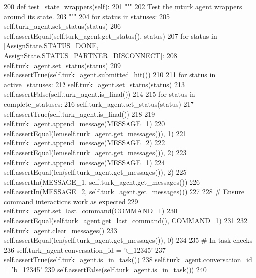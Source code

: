 \begin{DoxyCode}
200     \textcolor{keyword}{def }test\_state\_wrappers(self):
201         \textcolor{stringliteral}{"""}
202 \textcolor{stringliteral}{        Test the mturk agent wrappers around its state.}
203 \textcolor{stringliteral}{        """}
204         \textcolor{keywordflow}{for} status \textcolor{keywordflow}{in} statuses:
205             self.turk\_agent.set\_status(status)
206             self.assertEqual(self.turk\_agent.get\_status(), status)
207         \textcolor{keywordflow}{for} status \textcolor{keywordflow}{in} [AssignState.STATUS\_DONE, AssignState.STATUS\_PARTNER\_DISCONNECT]:
208             self.turk\_agent.set\_status(status)
209             self.assertTrue(self.turk\_agent.submitted\_hit())
210 
211         \textcolor{keywordflow}{for} status \textcolor{keywordflow}{in} active\_statuses:
212             self.turk\_agent.set\_status(status)
213             self.assertFalse(self.turk\_agent.is\_final())
214 
215         \textcolor{keywordflow}{for} status \textcolor{keywordflow}{in} complete\_statuses:
216             self.turk\_agent.set\_status(status)
217             self.assertTrue(self.turk\_agent.is\_final())
218 
219         self.turk\_agent.append\_message(MESSAGE\_1)
220         self.assertEqual(len(self.turk\_agent.get\_messages()), 1)
221         self.turk\_agent.append\_message(MESSAGE\_2)
222         self.assertEqual(len(self.turk\_agent.get\_messages()), 2)
223         self.turk\_agent.append\_message(MESSAGE\_1)
224         self.assertEqual(len(self.turk\_agent.get\_messages()), 2)
225         self.assertIn(MESSAGE\_1, self.turk\_agent.get\_messages())
226         self.assertIn(MESSAGE\_2, self.turk\_agent.get\_messages())
227 
228         \textcolor{comment}{# Ensure command interactions work as expected}
229         self.turk\_agent.set\_last\_command(COMMAND\_1)
230         self.assertEqual(self.turk\_agent.get\_last\_command(), COMMAND\_1)
231 
232         self.turk\_agent.clear\_messages()
233         self.assertEqual(len(self.turk\_agent.get\_messages()), 0)
234 
235         \textcolor{comment}{# In task checks}
236         self.turk\_agent.conversation\_id = \textcolor{stringliteral}{'t\_12345'}
237         self.assertTrue(self.turk\_agent.is\_in\_task())
238         self.turk\_agent.conversation\_id = \textcolor{stringliteral}{'b\_12345'}
239         self.assertFalse(self.turk\_agent.is\_in\_task())
240 
\end{DoxyCode}
\mbox{\label{classparlai_1_1mturk_1_1core_1_1legacy__2018_1_1test_1_1test__mturk__agent_1_1TestMTurkAgent_af125929ec3a33b4e9a631f2c89f3460a}} 
